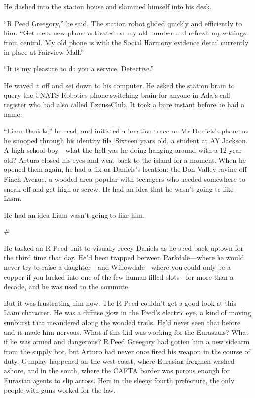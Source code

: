 He dashed into the station house and slammed himself into his
desk.

“R Peed Greegory,” he said. The station robot glided quickly and
efficiently to him. “Get me a new phone activated on my old number
and refresh my settings from central. My old phone is with the
Social Harmony evidence detail currently in place at Fairview
Mall.”

“It is my pleasure to do you a service, Detective.”

He waved it off and set down to his computer. He asked the station
brain to query the UNATS Robotics phone-switching brain for anyone
in Ada’s call-register who had also called ExcuseClub. It took a
bare instant before he had a name.

“Liam Daniels,” he read, and initiated a location trace on Mr
Daniels’s phone as he snooped through his identity file. Sixteen
years old, a student at AY Jackson. A high-school boy—what the hell
was he doing hanging around with a 12-year-old? Arturo closed his
eyes and went back to the island for a moment. When he opened them
again, he had a fix on Daniels’s location: the Don Valley ravine
off Finch Avenue, a wooded area popular with teenagers who needed
somewhere to sneak off and get high or screw. He had an idea that
he wasn’t going to like Liam.

He had an idea Liam wasn’t going to like him.

\#

He tasked an R Peed unit to visually reccy Daniels as he sped back
uptown for the third time that day. He’d been trapped between
Parkdale—where he would never try to raise a daughter—and
Willowdale—where you could only be a copper if you lucked into one
of the few human-filled slots—for more than a decade, and he was
used to the commute.

But it was frustrating him now. The R Peed couldn’t get a good look
at this Liam character. He was a diffuse glow in the Peed’s
electric eye, a kind of moving sunburst that meandered along the
wooded trails. He’d never seen that before and it made him nervous.
What if this kid was working for the Eurasians? What if he was
armed and dangerous? R Peed Greegory had gotten him a new sidearm
from the supply bot, but Arturo had never once fired his weapon in
the course of duty. Gunplay happened on the west coast, where
Eurasian frogmen washed ashore, and in the south, where the CAFTA
border was porous enough for Eurasian agents to slip across. Here
in the sleepy fourth prefecture, the only people with guns worked
for the law.

